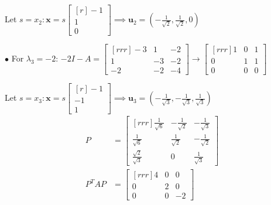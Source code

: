 \documentclass{article}
\newcommand\ddfrac[2]{\frac{\displaystyle #1}{\displaystyle #2}}
\begin{document}
\begin{minipage}{0.43\linewidth}
        Let $s = x_2: \textbf{x} = s \begin{bmatrix}[r]
            -1 \\
            1 \\
            0 
        \end{bmatrix}  \implies \textbf{u}_2 = \left( - \ddfrac{1}{\sqrt{2}} , \ddfrac{1}{\sqrt{2}} , 0 \right) $

        $\bullet$ For $ \lambda _3 = -2$: $-2I - A =  \begin{bmatrix}[rrr]
            -3 & 1 & -2 \\
            1 & -3 & -2 \\
            -2 & -2 & -4 
        \end{bmatrix} \to \begin{bmatrix}[rrr]
            1 & 0 & 1 \\
            0 & 1 & 1 \\
            0 & 0 & 0 
        \end{bmatrix} $

        Let $s = x_3: \textbf{x} = s \begin{bmatrix}[r]
            -1 \\
            -1 \\
            1 
        \end{bmatrix} \implies \textbf{u}_3 = \left( - \ddfrac{1}{\sqrt{3}} , - \ddfrac{1}{\sqrt{3}} , \ddfrac{1}{\sqrt{3}}  \right)$
        \begin{equation*}
            \begin{split}
                P &= \begin{bmatrix}[rrr]
                    \ddfrac{1}{\sqrt{6}} & - \ddfrac{1}{\sqrt{2}}  & - \ddfrac{1}{\sqrt{3}} \\
                    \ddfrac{1}{\sqrt{6}} & \ddfrac{1}{\sqrt{2}} & - \ddfrac{1}{\sqrt{2}} \\
                    \ddfrac{\sqrt{2}}{\sqrt{3}}  & 0 & \ddfrac{1}{\sqrt{3}} 
                \end{bmatrix}  \\
                    P^TAP& = \begin{bmatrix}[rrr]
                    4 & 0 & 0 \\
                    0 & 2 & 0 \\
                    0 & 0 & -2
                \end{bmatrix} 
            \end{split}
        \end{equation*}
    \end{minipage}%
    
\end{document}
